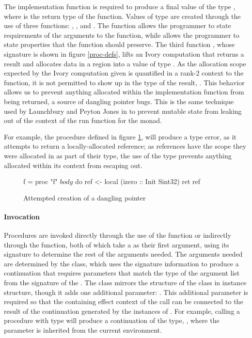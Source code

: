 The implementation function is required to produce a final value of the type
, where  is the return type of the function.  Values of type
 are created through the use of three functions: ,
, and .  The  function allows the programmer
to state requirements of the arguments to the function, while 
allows the programmer to state properties that the function should preserve. The
third function , whose signature is shown in figure \ref{proc-defs},
lifts an Ivory computation that returns a result  and allocates data in a
region  into a value of type .  As the allocation scope
expected by the Ivory computation given is quantified in a rank-2 context to the
 function, it is not permitted to show up in the type of the result,
.  This behavior allows us to prevent anything allocated within the
implementation function from being returned, a source of dangling pointer bugs.
This is the same technique used by Launchbury and Peyton Jones in \cite{stmonad}
to prevent mutable state from leaking out of the context of the run function for
the  monad.

For example, the procedure  defined in figure \ref{proc-def}, will produce
a type error, as it attempts to return a locally-allocated reference; as
references have the scope they were allocated in as part of their type, the use
of the  type prevents anything allocated within its context from
escaping out.

\begin{figure}[h]
\begin{code}
f = proc "f" $ body $ do
  ref <- local (izero :: Init Sint32)
  ret ref
\end{code}
\caption{Attempted creation of a dangling pointer}
\label{proc-def}
\end{figure}

\paragraph{Invocation} Procedures are invoked directly through the use of the
 function or indirectly through the  function, both of which
take a  as their first argument, using its signature to determine the
rest of the arguments needed.  The arguments needed are determined by the
 class, which uses the signature information to produce a
continuation that requires parameters that match the type of the argument list
from the signature of the .  The  class mirrors the
structure of the  class in instance structure, though it adds
one additional parameter: .  This additional parameter is required so
that the containing effect context of the call can be connected to the result of
the continuation generated by the instances of .  For example,
calling a procedure with type  will produce a
continuation of the type, , where the 
parameter is inherited from the current environment.

